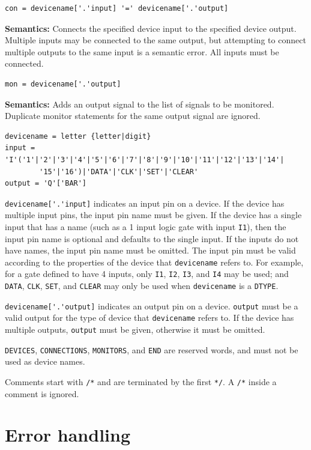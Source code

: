 \documentclass[a4paper,10pt]{article}
\begin{document}
\begin{verbatim}
con = devicename['.'input] '=' devicename['.'output]
\end{verbatim} 
\textbf{Semantics:} Connects the specified device input to the specified device output. Multiple inputs may be connected to the same output, but attempting to connect multiple outputs to the same input is a semantic error. All inputs must be connected. 

\begin{verbatim}
mon = devicename['.'output]
\end{verbatim} 
\textbf{Semantics:} Adds an output signal to the list of signals to be monitored. Duplicate monitor statements for the same output signal are ignored. 

\begin{verbatim}
devicename = letter {letter|digit}
input = 'I'('1'|'2'|'3'|'4'|'5'|'6'|'7'|'8'|'9'|'10'|'11'|'12'|'13'|'14'|
        '15'|'16')|'DATA'|'CLK'|'SET'|'CLEAR'
output = 'Q'['BAR']
\end{verbatim} 

\verb|devicename['.'input]| indicates an input pin on a device. If the device has multiple input pins, the input pin name must be given. If the device has a single input that has a name (such as a 1 input logic gate with input \texttt{I1}), then the input pin name is optional and defaults to the single input. If the inputs do not have names, the input pin name must be omitted.
The input pin must be valid according to the properties of the device that \texttt{devicename} refers to. For example, for a gate defined to have 4 inputs, only \texttt{I1}, \texttt{I2}, \texttt{I3}, and \texttt{I4} may be used; and \texttt{DATA}, \texttt{CLK}, \texttt{SET}, and \texttt{CLEAR} may only be used when \texttt{devicename} is a \texttt{DTYPE}.

\verb|devicename['.'output]| indicates an output pin on a device. \texttt{output} must be a valid output for the type of device that \texttt{devicename} refers to. If the device has multiple outputs, \texttt{output} must be given, otherwise it must be omitted. 

\texttt{DEVICES}, \texttt{CONNECTIONS}, \texttt{MONITORS}, and \texttt{END} are reserved words, and must not be used as device names.

Comments start with \texttt{/*} and are terminated by the first \texttt{*/}. A \texttt{/*} inside a comment is ignored. 

\section{Error handling}
\end{document}
